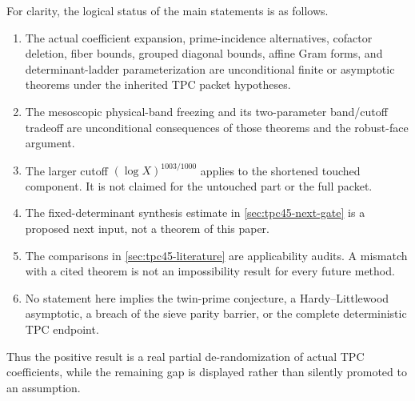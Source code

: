 For clarity, the logical status of the main statements is as follows.
\begin{enumerate}[label=\textup{\arabic*.},leftmargin=2.2em]
 \item The actual coefficient expansion, prime-incidence alternatives,
 cofactor deletion, fiber bounds, grouped diagonal bounds, affine Gram
 forms, and determinant-ladder parameterization are unconditional finite
 or asymptotic theorems under the inherited TPC packet hypotheses.
 \item The mesoscopic physical-band freezing and its two-parameter
 band/cutoff tradeoff are unconditional consequences of those theorems
 and the robust-face argument.
 \item The larger cutoff \((\log X)^{1003/1000}\) applies to the
 shortened touched component.  It is not claimed for the untouched part
 or the full packet.
 \item The fixed-determinant synthesis estimate in
 \cref{sec:tpc45-next-gate} is a proposed next input, not a theorem of
 this paper.
 \item The comparisons in \cref{sec:tpc45-literature} are applicability
 audits.  A mismatch with a cited theorem is not an impossibility result
 for every future method.
 \item No statement here implies the twin-prime conjecture, a
 Hardy--Littlewood asymptotic, a breach of the sieve parity barrier, or
 the complete deterministic TPC endpoint.
\end{enumerate}

Thus the positive result is a real partial de-randomization of actual
TPC coefficients, while the remaining gap is displayed rather than
silently promoted to an assumption.
